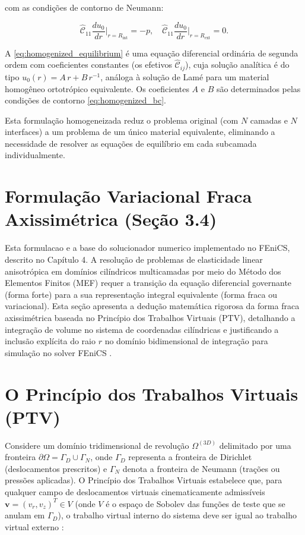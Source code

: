 com as condições de contorno de Neumann:

\begin{equation}
  \hat{\mathcal{C}}_{11} \frac{du_0}{dr}\bigg|_{r=R_{\text{int}}} = -p, \quad \hat{\mathcal{C}}_{11} \frac{du_0}{dr}\bigg|_{r=R_{\text{ext}}} = 0.
  \label{eq:homogenized_bc}
\end{equation}

A \eqref{eq:homogenized_equilibrium} é uma equação diferencial ordinária de segunda ordem com coeficientes constantes (os efetivos $\hat{\mathcal{C}}_{ij}$), cuja solução analítica é do tipo $u_0(r) = A \, r + B \, r^{-1}$, análoga à solução de Lamé para um material homogêneo ortotrópico equivalente. Os coeficientes $A$ e $B$ são determinados pelas condições de contorno \eqref{eq:homogenized_bc}.

Esta formulação homogeneizada reduz o problema original (com $N$ camadas e $N$ interfaces) a um problema de um único material equivalente, eliminando a necessidade de resolver as equações de equilíbrio em cada subcamada individualmente.

\section{Formulação Variacional Fraca Axissimétrica (Seção 3.4)}


Esta formulacao e a base do solucionador numerico implementado no FEniCS, descrito no Capítulo 4.
A resolução de problemas de elasticidade linear anisotrópica em domínios cilíndricos multicamadas por meio do Método dos Elementos Finitos (MEF) requer a transição da equação diferencial governante (forma forte) para a sua representação integral equivalente (forma fraca ou variacional). Esta seção apresenta a dedução matemática rigorosa da forma fraca axissimétrica baseada no Princípio dos Trabalhos Virtuais (PTV), detalhando a integração de volume no sistema de coordenadas cilíndricas e justificando a inclusão explícita do raio $r$ no domínio bidimensional de integração para simulação no solver FEniCS \cite{logg2012automated}.

\section{O Princípio dos Trabalhos Virtuais (PTV)}

Considere um domínio tridimensional de revolução $\Omega^{(3D)}$ delimitado por uma fronteira $\partial \Omega = \Gamma_D \cup \Gamma_N$, onde $\Gamma_D$ representa a fronteira de Dirichlet (deslocamentos prescritos) e $\Gamma_N$ denota a fronteira de Neumann (trações ou pressões aplicadas). O Princípio dos Trabalhos Virtuais estabelece que, para qualquer campo de deslocamentos virtuais cinematicamente admissíveis $\mathbf{v} = (v_r, v_z)^T \in V$ (onde $V$ é o espaço de Sobolev das funções de teste que se anulam em $\Gamma_D$), o trabalho virtual interno do sistema deve ser igual ao trabalho virtual externo \cite{Sadd2009}:

